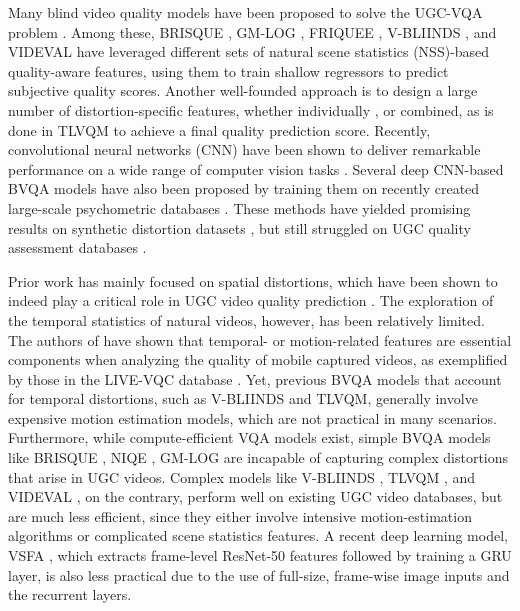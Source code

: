\documentclass[transmag]{IEEEtran}
\begin{document}
Many blind video quality models have been proposed to solve the UGC-VQA problem \cite{moorthy2011blind, mittal2012no, saad2014blind, kundu2017no,xue2014blind, ghadiyaram2017perceptual, korhonen2019two, ye2012unsupervised, pei2015image, tu2020ugc, ebenezer2020no, yu2020predicting, ying2019patches, ying2020patch, li2019quality}. Among these, BRISQUE \cite{mittal2012no}, GM-LOG \cite{xue2014blind}, FRIQUEE \cite{ghadiyaram2017perceptual}, V-BLIINDS \cite{saad2014blind}, and VIDEVAL \cite{tu2020ugc} have leveraged different sets of natural scene statistics (NSS)-based quality-aware features, using them to train shallow regressors to predict subjective quality scores. Another well-founded approach is to design a large number of distortion-specific features, whether individually \cite{feng2006measurement, tu2020bband, norkin2018film}, or combined, as is done in TLVQM \cite{korhonen2019two} to achieve a final quality prediction score.  Recently, convolutional neural networks (CNN) have been shown to deliver remarkable performance on a wide range of computer vision tasks \cite{chen2020proxiqa, wang2019going, chen2020learning}. Several deep CNN-based BVQA models have also been proposed \cite{kim2018deep, zhang2018blind, li2019quality, ying2020patch} by training them on recently created large-scale psychometric databases \cite{lin2018koniq, ghadiyaram2015massive}. These methods have yielded promising results on synthetic distortion datasets \cite{seshadrinathan2010study}, but still struggled on UGC quality assessment databases \cite{sinno2018large, hosu2017konstanz, wang2019youtube}.

Prior work has mainly focused on spatial distortions, which have been shown to indeed play a critical role in UGC video quality prediction \cite{tu2020ugc}. The exploration of the temporal statistics of natural videos, however, has been relatively limited. The authors of \cite{tu2020ugc} have shown that temporal- or motion-related features are essential components when analyzing the quality of mobile captured videos, as exemplified by those in the LIVE-VQC database \cite{sinno2018large}. Yet, previous BVQA models that account for temporal distortions, such as V-BLIINDS and TLVQM, generally involve expensive motion estimation models, which are not practical in many scenarios. Furthermore, while compute-efficient VQA models exist, simple BVQA models like BRISQUE \cite{mittal2012no}, NIQE \cite{mittal2012making}, GM-LOG \cite{xue2014blind} are incapable of capturing complex distortions that arise in UGC videos. Complex models like V-BLIINDS \cite{saad2014blind}, TLVQM \cite{korhonen2019two}, and VIDEVAL \cite{tu2020ugc}, on the contrary, perform well on existing UGC video databases, but are much less efficient, since they either involve intensive motion-estimation algorithms or complicated scene statistics features. A recent deep learning model, VSFA \cite{li2019quality}, which extracts frame-level ResNet-50 \cite{he2016deep} features followed by training a GRU layer, is also less practical due to the use of full-size, frame-wise image inputs and the recurrent layers. 
\end{document}
